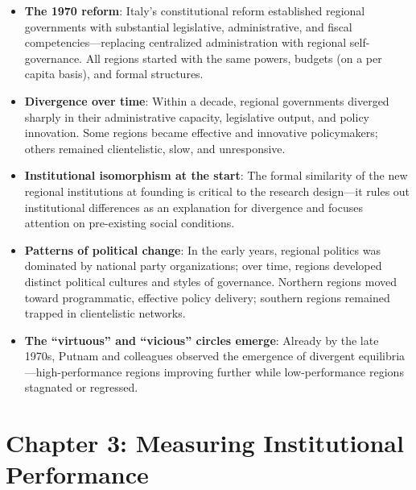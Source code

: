 \documentclass[12pt]{article}
\begin{document}
\begin{itemize}[leftmargin=*, itemsep=4pt]
    \item \textbf{The 1970 reform}: Italy's constitutional reform established regional governments with substantial legislative, administrative, and fiscal competencies---replacing centralized administration with regional self-governance. All regions started with the same powers, budgets (on a per capita basis), and formal structures.
    \item \textbf{Divergence over time}: Within a decade, regional governments diverged sharply in their administrative capacity, legislative output, and policy innovation. Some regions became effective and innovative policymakers; others remained clientelistic, slow, and unresponsive.
    \item \textbf{Institutional isomorphism at the start}: The formal similarity of the new regional institutions at founding is critical to the research design---it rules out institutional differences as an explanation for divergence and focuses attention on pre-existing social conditions.
    \item \textbf{Patterns of political change}: In the early years, regional politics was dominated by national party organizations; over time, regions developed distinct political cultures and styles of governance. Northern regions moved toward programmatic, effective policy delivery; southern regions remained trapped in clientelistic networks.
    \item \textbf{The ``virtuous'' and ``vicious'' circles emerge}: Already by the late 1970s, Putnam and colleagues observed the emergence of divergent equilibria---high-performance regions improving further while low-performance regions stagnated or regressed.
\end{itemize}

\section{Chapter 3: Measuring Institutional Performance}
\end{document}
